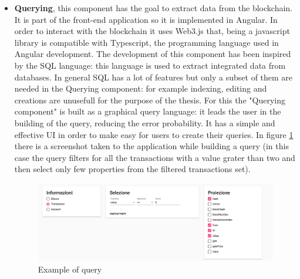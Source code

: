 \begin{itemize}
    \item \textbf{Querying}, this component has the goal to extract data from the blockchain. It is part of the front-end 
        application so it is implemented in Angular. In order to 
        interact with the blockchain it uses Web3.js that, being a javascript library is compatible with Typescript, the 
        programming language used in Angular development. The development of this component has been inspired by the SQL 
        language: this language is used to extract integrated data from databases. In general SQL has a lot of features but only 
        a subset of them are needed in the Querying component: for example indexing, editing and creations are unusefull for the purpose of 
        the thesis. For this the "Querying component" is built as a graphical query language: it leads the user in the building of the 
        query, reducing the error probability. It has a simple and effective UI in order to make easy for users to create their queries.
        In figure \ref{images:design_query_screen} there is a screenshot taken to the application while building a query (in this
        case the query filters for all the transactions with a value grater than two and then select only few properties from the 
        filtered transactions set).

        \begin{figure}[!ht]
            \centering
        \includegraphics[width=\textwidth]{images/design_query_screen.png}
            \caption{Example of query}
            \label{images:design_query_screen}
        \end{figure}


\end{itemize}
